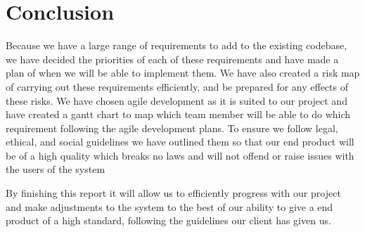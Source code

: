 \section{Conclusion}
Because we have a large range of requirements to add to the existing codebase, we have decided the priorities of each of these requirements and have made a plan of when we will be able to implement them. We have also created a risk map of carrying out these requirements efficiently, and be prepared for any effects of these risks. 
We have chosen agile development as it is suited to our project and have created a gantt chart to map which team member will be able to do which requirement following the agile development plans. 
To ensure we follow legal, ethical, and social guidelines we have outlined them so that our end product will be of a high quality which breaks no laws and will not offend or raise issues with the users of the system

By finishing this report it will allow us to efficiently progress with our project and make adjustments to the system to the best of our ability to give a end product of a high standard, following the guidelines our client has given us.

  
